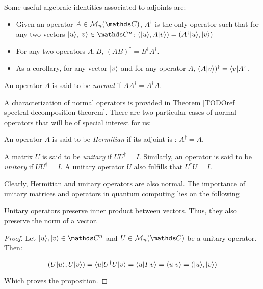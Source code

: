 Some useful algebraic identities associated to adjoints are:

\begin{itemize}
	\item Given an operator $A \in \mathcal{M}_{n}(\C)$, $A^\dagger$ is the only operator such that for any two vectors $|u\ra, |v\ra \in \C^n$: $( |u\rangle, A|v\rangle) = ( A^\dagger |u\rangle, |v\rangle)$
	\item For any two operators $A,B$, $(AB)^\dagger = B^\dagger A^\dagger$.
	\item As a corollary, for any vector $|v\rangle$ and for any operator $A$, $(A|v\rangle)^\dagger = \langle v|A^\dagger$.
\end{itemize}

\begin{definition}
	An operator $A$ is said to be \emph{normal} if $AA^\dagger = A^\dagger A$.
\end{definition}

A characterization of normal operators is provided in Theorem [TODOref spectral decomposition theorem]. There are two particular cases of normal operators that will be of special interest for us:

\begin{definition}
	An operator $A$ is said to be \emph{Hermitian} if its adjoint is : $A^\dagger = A$.
\end{definition}

\begin{definition}
	A matrix $U$ is said to be \emph{unitary} if $UU^\dagger = I$. Similarly, an operator is said to be \emph{unitary} if $UU^\dagger = I$. A unitary operator $U$ also fulfills that $U^\dagger U = I$.
\end{definition}

Clearly, Hermitian and unitary operators are also normal. The importance of unitary matrices and operators in quantum computing lies on the following

\begin{proposition}
	Unitary operators preserve inner product between vectors. Thus, they also preserve the norm of a vector.
\end{proposition}

\begin{proof}
	Let $|u\ra, |v\ra \in \C^n$ and $U \in \mathcal{M}_n(\C)$ be a unitary operator. Then:
	
	$$ ( U|u\rangle, U|v\rangle) = \langle u|U^\dagger U|v\rangle = \langle u|I|v\rangle = \langle u|v\rangle = ( |u\rangle, |v\rangle) $$
	
	Which proves the proposition.
\end{proof}

